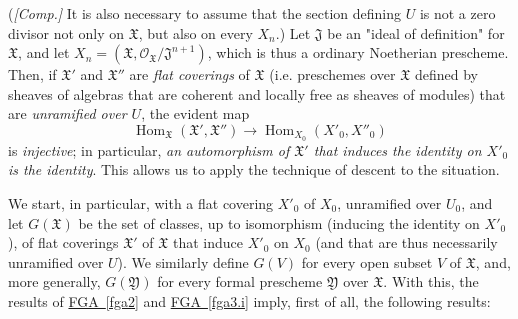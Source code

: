   (\emph{[Comp.]} It is also necessary to assume that the section defining \(U\) is not a zero divisor not only on \(\mathfrak {X}\), but also on every \(X_n\).)
  Let \(\mathfrak {J}\) be an "ideal of definition" for \(\mathfrak {X}\), and let \(X_n=(\mathfrak {X},\mathscr {O}_\mathfrak {X}/\mathfrak {J}^{n+1})\), which is thus a ordinary Noetherian prescheme.
  Then, if \(\mathfrak {X}'\) and \(\mathfrak {X}''\) are \emph{flat coverings} of \(\mathfrak {X}\) (i.e. preschemes over \(\mathfrak {X}\) defined by sheaves of algebras that are coherent and locally free as sheaves of modules) that are \emph{unramified over \(U\)}, the evident map
  \[     \operatorname {Hom}_\mathfrak {X}(\mathfrak {X}',\mathfrak {X}'')     \to  \operatorname {Hom}_{X_0}(X'_0,X''_0)   \]
  is \emph{injective};
  in particular, \emph{an automorphism of \(\mathfrak {X}'\) that induces the identity on \(X'_0\) is the identity}.
  This allows us to apply the technique of descent to the situation.
  
  We start, in particular, with a flat covering \(X'_0\) of \(X_0\), unramified over \(U_0\), and let \(G(\mathfrak {X})\) be the set of classes, up to isomorphism (inducing the identity on \(X'_0\)), of flat coverings \(\mathfrak {X}'\) of \(\mathfrak {X}\) that induce \(X'_0\) on \(X_0\) (and that are thus necessarily unramified over \(U\)).
  We similarly define \(G(V)\) for every open subset \(V\) of \(\mathfrak {X}\), and, more generally, \(G(\mathfrak {Y})\) for every formal prescheme \(\mathfrak {Y}\) over \(\mathfrak {X}\).
  With this, the results of \hyperref[fga2]{FGA~\ref*{fga2}} and \hyperref[fga3.i]{FGA~\ref*{fga3.i}} imply, first of all, the following results:

